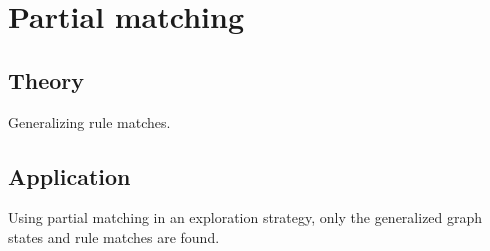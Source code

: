 \section{Partial matching}

\subsection{Theory}
Generalizing rule matches.

\subsection{Application}
Using partial matching in an exploration strategy, only the generalized graph states and rule matches are found.
